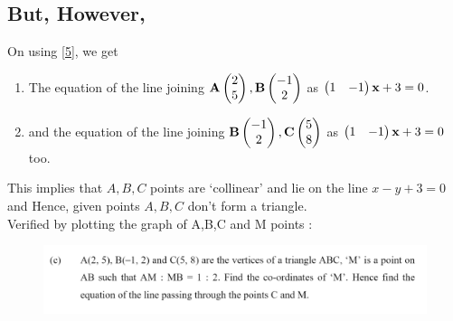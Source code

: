 \documentclass[journal,12pt,twocolumn]{IEEEtran}
\begin{document}
\subsection*{But, However,} On using \eqref{5}, we get
\newline
\begin{enumerate}
    \item The equation of the line joining $\mathbf{A}\begin{pmatrix}2\\5\end{pmatrix}, \mathbf{B}\begin{pmatrix}-1\\2\end{pmatrix}$ as $\begin{pmatrix}1 & - 1\end{pmatrix}\mathbf{x} + 3 = 0$. 
    \newline
    \item and the equation of the line joining $\mathbf{B}\begin{pmatrix}-1\\2\end{pmatrix}, \mathbf{C}\begin{pmatrix}5\\8\end{pmatrix}$ as $\begin{pmatrix}1 & - 1\end{pmatrix}\mathbf{x} + 3 = 0$ too.\newline
\end{enumerate}

 This implies that $A,B,C$ points are `collinear' and lie on the line $x-y+3=0$ and Hence, given points $A,B,C$ don't form a triangle.\newline\\
Verified by plotting the graph of A,B,C and M points :
\begin{figure}[ht!]
\centering
\includegraphics[width=\columnwidth]{prv1a.png}
\end{figure}
 
\end{document}
